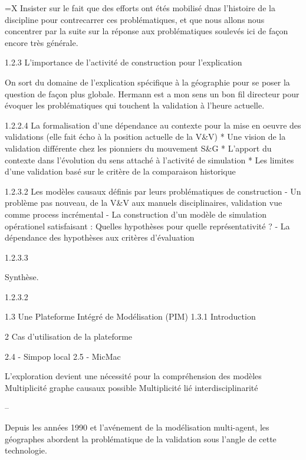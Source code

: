 			=X Insister sur le fait que des efforts ont étés mobilisé dnas l'histoire de la discipline pour contrecarrer ces problématiques, et que nous allons nous concentrer par la suite sur la réponse aux problématiques soulevés ici de façon encore très générale.

	1.2.3 L'importance de l'activité de construction pour l'explication
		
		On sort du domaine de l'explication spécifique à la géographie pour se poser la question de façon plus globale. Hermann est a mon sens un bon fil directeur pour évoquer les problématiques qui touchent la validation à l'heure actuelle.

		1.2.2.4 La formalisation d'une dépendance au contexte pour la mise en oeuvre des validations
			(elle fait écho à la position actuelle de la V\&V)
			* Une vision de la validation différente chez les pionniers du mouvement S\&G
			* L'apport du contexte dans l'évolution du sens attaché à l'activité de simulation
			* Les limites d'une validation basé sur le critère de la comparaison historique

		1.2.3.2 Les modèles causaux définis par leurs problématiques de construction 
 			- Un problème pas nouveau, de la V\&V aux manuels disciplinaires, validation vue comme process incrémental
			- La construction d'un modèle de simulation opérationel satisfaisant : Quelles hypothèses pour quelle représentativité ? 
			- La dépendance des hypothèses aux critères d'évaluation

		1.2.3.3 

		Synthèse.


			1.2.3.2 
			


1.3 Une Plateforme Intégré de Modélisation (PIM)
	1.3.1 Introduction

2 Cas d'utilisation de la plateforme

	2.4 - Simpop local
	2.5 - MicMac 

L'exploration devient une nécessité pour la compréhension des modèles
	Multiplicité graphe causaux possible
	Multiplicité lié interdisciplinarité



--

Depuis les années 1990 et l'avénement de la modélisation multi-agent, les géographes abordent la problématique de la validation sous l'angle de cette technologie.

